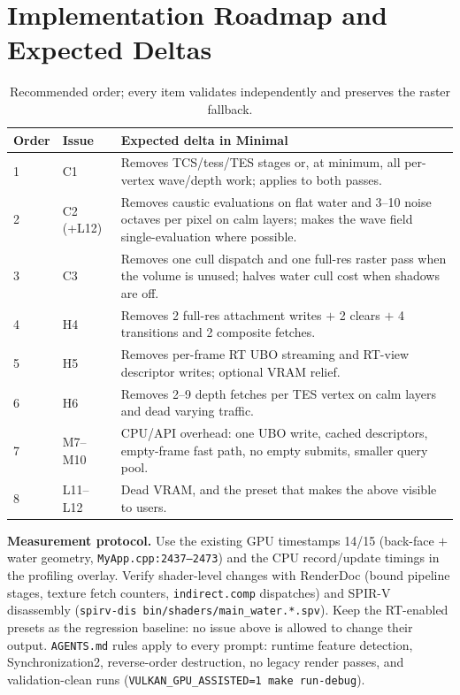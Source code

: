 \documentclass[11pt,a4paper]{article}
\begin{document}
\section{Implementation Roadmap and Expected Deltas}

\begin{table}[h]
\centering
\small
\begin{tabular}{@{}llp{6.2cm}@{}}
\toprule
\textbf{Order} & \textbf{Issue} & \textbf{Expected delta in Minimal} \\
\midrule
1 & C1 & Removes TCS/tess/TES stages or, at minimum, all per-vertex wave/depth work; applies to both passes. \\
2 & C2 (+L12) & Removes caustic evaluations on flat water and 3--10 noise octaves per pixel on calm layers; makes the wave field single-evaluation where possible. \\
3 & C3 & Removes one cull dispatch and one full-res raster pass when the volume is unused; halves water cull cost when shadows are off. \\
4 & H4 & Removes 2 full-res attachment writes $+$ 2 clears $+$ 4 transitions and 2 composite fetches. \\
5 & H5 & Removes per-frame RT UBO streaming and RT-view descriptor writes; optional VRAM relief. \\
6 & H6 & Removes 2--9 depth fetches per TES vertex on calm layers and dead varying traffic. \\
7 & M7--M10 & CPU/API overhead: one UBO write, cached descriptors, empty-frame fast path, no empty submits, smaller query pool. \\
8 & L11--L12 & Dead VRAM, and the preset that makes the above visible to users. \\
\bottomrule
\end{tabular}
\caption{Recommended order; every item validates independently and preserves the raster fallback.}
\end{table}

\textbf{Measurement protocol.} Use the existing GPU timestamps 14/15 (back-face $+$ water geometry, \texttt{MyApp.cpp:2437--2473}) and the CPU record/update timings in the
profiling overlay. Verify shader-level changes with RenderDoc (bound pipeline stages, texture fetch counters, \texttt{indirect.comp} dispatches) and SPIR-V disassembly
(\texttt{spirv-dis bin/shaders/main\_water.*.spv}). Keep the RT-enabled presets as the regression baseline: no issue above is allowed to change their output.
\texttt{AGENTS.md} rules apply to every prompt: runtime feature detection, Synchronization2, reverse-order destruction, no legacy render passes, and validation-clean runs
(\texttt{VULKAN\_GPU\_ASSISTED=1 make run-debug}).
\end{document}
